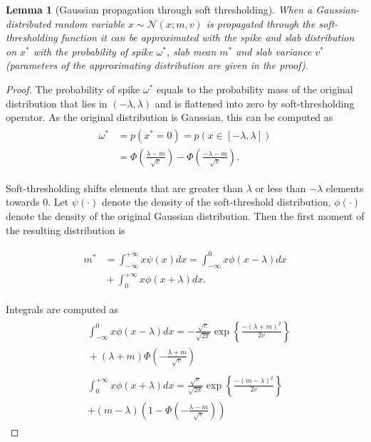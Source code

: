 \documentclass[letterpaper]{article}
\newtheorem{lemma}{Lemma}
\begin{document}
\begin{lemma}[Gaussian propagation through soft thresholding]
\label{thm:soft_thresholding}
When a Gaussian-distributed random variable $x \sim \mathcal{N}(x; m, v)$ is propagated through the soft-thresholding function it can be approximated with the spike and slab distribution on $x^*$ with the probability of spike $\omega^*$, slab mean $m^*$ and slab variance $v^*$ (parameters of the approximating distribution are given in the proof).
\end{lemma}
\begin{proof}

The probability of spike $\omega^*$ equals to the probability mass of the original distribution that lies in $(-\lambda, \lambda)$  and is flattened into zero by soft-thresholding operator. As the original distribution is Gaussian, this can be computed as 
\begin{align}
\begin{split}
\omega^* &= p(x^*=0) = p(x \in [-\lambda, \lambda]) \\
&= \Phi\left(\frac{\lambda-m}{\sqrt{v}}\right) - \Phi\left(\frac{-\lambda-m}{\sqrt{v}}\right). 
\end{split}
\end{align}

Soft-thresholding shifts elements that are greater than $\lambda$  or less than $-\lambda$ elements towards 0. Let $\psi(\cdot)$ denote the density of the soft-threshold distribution, $\phi(\cdot)$ denote the density of the original Gaussian distribution. Then the first moment of the resulting distribution is 

\begin{align}
\begin{split}
m^* &= \int_{-\infty}^{+\infty}x\psi(x)dx= \int_{-\infty}^{0}x\phi(x-\lambda)dx \\
&{} + \int_{0}^{+\infty}x\phi(x+\lambda)dx.
\end{split}
\end{align}

Integrals are computed as
\begin{align}
\begin{split}
&\int_{-\infty}^{0}x\phi(x-\lambda)dx = -\frac{\sqrt{v}}{\sqrt{2\pi}} \exp\left\{\frac{-(\lambda+m)^2}{2v}\right\} \\
&{} + (\lambda+m)\Phi\left(-\frac{\lambda+m}{\sqrt{v}}\right)
\end{split}\\
\begin{split}
&\int_{0}^{+\infty}x\phi(x+\lambda)dx = \frac{\sqrt{v}}{\sqrt{2\pi}} \exp\left\{\frac{-(m - \lambda)^2}{2v}\right\}\\
& + (m - \lambda)\left(1 - \Phi\left(-\frac{\lambda-m}{\sqrt{v}}\right)\right)
\end{split}
\end{align}


\end{proof}
\end{document}
